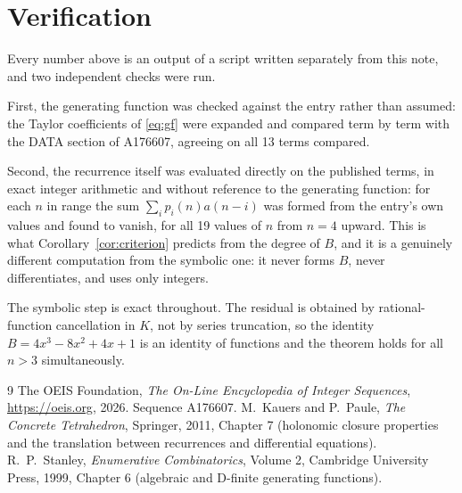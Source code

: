 \documentclass[11pt,a4paper]{article}
\theoremstyle{plain}
\theoremstyle{definition}
\begin{document}
\section{Verification}

Every number above is an output of a script written separately from this note, and two
independent checks were run.

First, the generating function was checked against the entry rather than assumed: the
Taylor coefficients of \eqref{eq:gf} were expanded and compared term by term with the DATA
section of A176607, agreeing on all 13 terms compared.

Second, the recurrence itself was evaluated directly on the published terms, in exact
integer arithmetic and without reference to the generating function: for each $n$ in range
the sum $\sum_{i}p_{i}(n)a(n-i)$ was formed from the entry's own values and found to
vanish, for all 19 values of $n$ from $n=4$ upward. This is what
Corollary~\ref{cor:criterion} predicts from the degree of $B$, and it is a genuinely
different computation from the symbolic one: it never forms $B$, never differentiates, and
uses only integers.

The symbolic step is exact throughout. The residual is obtained by rational-function
cancellation in $K$, not by series truncation, so the identity $B=4 x^{3} - 8 x^{2} + 4 x + 1$ is an
identity of functions and the theorem holds for all $n>3$ simultaneously.

\begin{thebibliography}{9}
 The OEIS Foundation, \emph{The On-Line Encyclopedia of Integer Sequences},
\url{https://oeis.org}, 2026. Sequence A176607.
 M.~Kauers and P.~Paule, \emph{The Concrete Tetrahedron}, Springer, 2011,
Chapter 7 (holonomic closure properties and the translation between recurrences and
differential equations).
 R.~P.~Stanley, \emph{Enumerative Combinatorics}, Volume 2, Cambridge
University Press, 1999, Chapter 6 (algebraic and D-finite generating functions).
\end{thebibliography}
\end{document}
